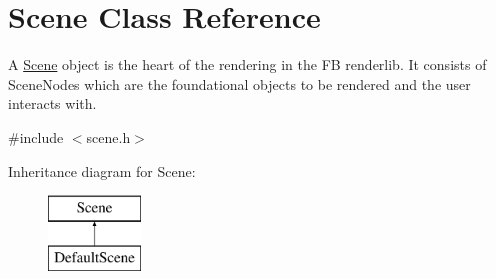 \hypertarget{class_scene}{}\section{Scene Class Reference}
\label{class_scene}


A \hyperlink{class_scene}{Scene} object is the heart of the rendering in the FB renderlib. It consists of Scene\+Nodes which are the foundational objects to be rendered and the user interacts with.  




{\ttfamily \#include $<$scene.\+h$>$}

Inheritance diagram for Scene\+:\begin{figure}[H]
\begin{center}
\leavevmode
\includegraphics[height=2.000000cm]{class_scene}
\end{center}
\end{figure}
